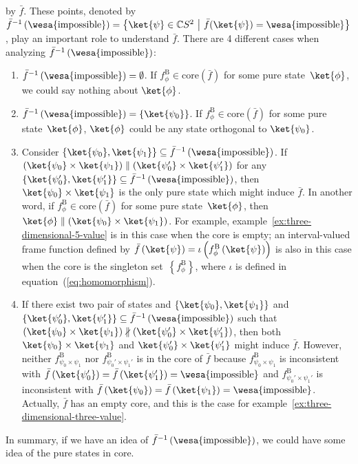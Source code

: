 \documentclass[12pt]{iopart}
\theoremstyle{plain}
\theoremstyle{definition}
\theoremstyle{remark}
\newcommand{\imposs}{{\mbox{\wesa{impossible}}}}
\newcommand{\set}[2]{\ensuremath{\left\{ {#1}~\middle|~{#2}\right\} }}
\begin{document}
by $\bar{f}$. These points, denoted by $\bar{f}^{-1}\left(\imposs\right)=\set{\ket{\psi}\in\mathbb{C}S^{2}}{\bar{f}(\ket{\psi})=\imposs}$,
play an important role to understand $\bar{f}$. There are 4 different
cases when analyzing $\bar{f}^{-1}\left(\imposs\right)$:
\begin{enumerate}
\item $\bar{f}^{-1}\left(\imposs\right)=\emptyset$. If $f_{\phi}^{\mathrm{B}}\in\mathrm{core}\left(\bar{f}\right)$
for some pure state~$\ket{\phi}$, we could say nothing about $\ket{\phi}$.
\item $\bar{f}^{-1}\left(\imposs\right)=\left\{ \ket{\psi_{0}}\right\} $.
If $f_{\phi}^{\mathrm{B}}\in\mathrm{core}\left(\bar{f}\right)$ for some pure
state~$\ket{\phi}$, $\ket{\phi}$ could be any state orthogonal
to $\ket{\psi_{0}}$.
\item Consider $\left\{ \ket{\psi_{0}},\ket{\psi_{1}}\right\} \subseteq\bar{f}^{-1}\left(\imposs\right)$.
If $\left(\ket{\psi_{0}}\times\ket{\psi_{1}}\right)\parallel\left(\ket{\psi_{0}'}\times\ket{\psi_{1}'}\right)$
for any $\left\{ \ket{\psi_{0}'},\ket{\psi_{1}'}\right\} \subseteq\bar{f}^{-1}\left(\imposs\right)$,
then $\ket{\psi_{0}}\times\ket{\psi_{1}}$ is the only pure state
which might induce $\bar{f}$. In another word, if $f_{\phi}^{\mathrm{B}}\in\mathrm{core}\left(\bar{f}\right)$
for some pure state~$\ket{\phi}$, then $\ket{\phi}\parallel\left(\ket{\psi_{0}}\times\ket{\psi_{1}}\right)$.
For example, example~\ref{ex:three-dimensional-5-value} is in this
case when the core is empty; an interval-valued frame function defined
by $\bar{f}\left(\ket{\psi}\right)=\iota\left(f_{\phi}^{\mathrm{B}}\left(\ket{\psi}\right)\right)$
is also in this case when the core is the singleton set~$\left\{ f_{\phi}^{\mathrm{B}}\right\} $,
where $\iota$ is defined in equation~(\ref{eq:homomorphism}). 
\item If there exist two pair of states and $\left\{ \ket{\psi_{0}},\ket{\psi_{1}}\right\} $
and $\left\{ \ket{\psi_{0}'},\ket{\psi_{1}'}\right\} \subseteq\bar{f}^{-1}\left(\imposs\right)$
such that $\left(\ket{\psi_{0}}\times\ket{\psi_{1}}\right)\nparallel\left(\ket{\psi_{0}'}\times\ket{\psi_{1}'}\right)$,
then both $\ket{\psi_{0}}\times\ket{\psi_{1}}$ and $\ket{\psi_{0}'}\times\ket{\psi_{1}'}$
might induce $\bar{f}$. However, neither $f_{\psi_{0}\times\psi_{1}}^{\mathrm{B}}$
nor $f_{\psi_{0}'\times\psi_{1}'}^{\mathrm{B}}$ is in the core of $\bar{f}$
because $f_{\psi_{0}\times\psi_{1}}^{\mathrm{B}}$ is inconsistent with $\bar{f}\left(\ket{\psi_{0}'}\right)=\bar{f}\left(\ket{\psi_{1}'}\right)=\imposs$
and $f_{\psi_{0}'\times\psi_{1}'}^{\mathrm{B}}$ is inconsistent with $\bar{f}\left(\ket{\psi_{0}}\right)=\bar{f}\left(\ket{\psi_{1}}\right)=\imposs$.
Actually, $\bar{f}$ has an empty core, and this is the case for example~\ref{ex:three-dimensional-three-value}.
\end{enumerate}
In summary, if we have an idea of $\bar{f}^{-1}\left(\imposs\right)$,
we could have some idea of the pure states in core.
\end{document}
